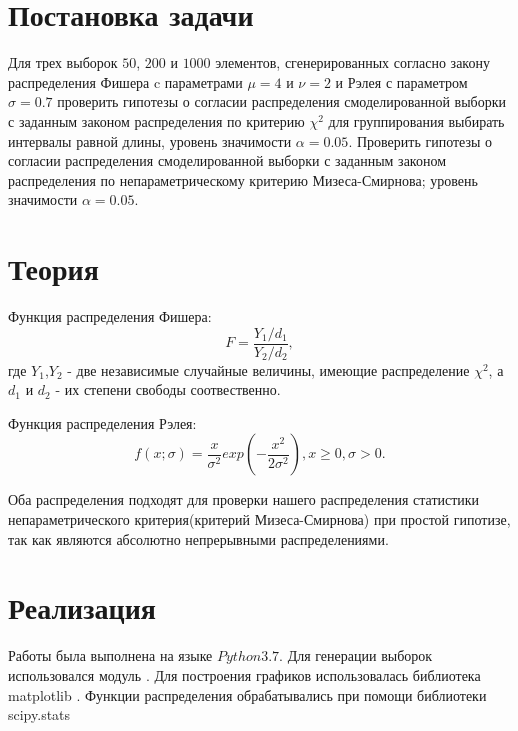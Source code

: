 \documentclass[a4]{article}
\renewcommand{\listoftables}{\begingroup %
\tocsection
\tocfile{\listtablename}{lot}
\endgroup}
\begin{document}
\newpage
\pagestyle{plain}




\newpage
\tableofcontents{}
\newpage
\listoftables{}
\newpage

\section{Постановка задачи}

Для трех выборок $50$, $200$ и $1000$ элементов, сгенерированных согласно закону распределения Фишера c параметрами $\mu = 4$ и $\nu = 2$ и Рэлея с параметром $\sigma = 0.7$ проверить гипотезы о согласии распределения смоделированной выборки с заданным законом распределения по критерию $\chi^2$ для группирования выбирать интервалы равной длины, уровень значимости $\alpha = 0.05$. Проверить гипотезы о согласии распределения смоделированной выборки с заданным законом распределения по непараметрическому критерию Мизеса-Смирнова; уровень значимости $\alpha = 0.05$. 

\section{Теория}

Функция распределения Фишера:
\begin{equation}
    F = \frac{Y_{1}/d_{1} }{Y_{2}/d_{2}},
\end{equation}
 где $Y_{1}$,$ Y_{2}$ - две независимые случайные величины, имеющие распределение $\chi^2$, а $d_{1}$ и $d_{2}$ - их степени свободы соотвественно.

Функция распределения Рэлея:
\begin{equation}
    f(x;\sigma) = \frac{x} {\sigma^2}exp\left(-\frac{x^2}{2\sigma^2}\right), x \geqslant 0, \sigma > 0.
\end{equation}

Оба распределения подходят для проверки нашего распределения статистики непараметрического критерия(критерий Мизеса-Смирнова) при простой гипотизе, так как являются абсолютно непрерывными распределениями.

\section{Реализация}
Работы была выполнена на языке $Python 3.7.$
Для генерации выборок использовался модуль \cite{numpy}.
Для построения графиков использовалась библиотека matplotlib \cite{plotlib}.
Функции распределения обрабатывались при помощи библиотеки scipy.stats \cite{skp}
\end{document}
